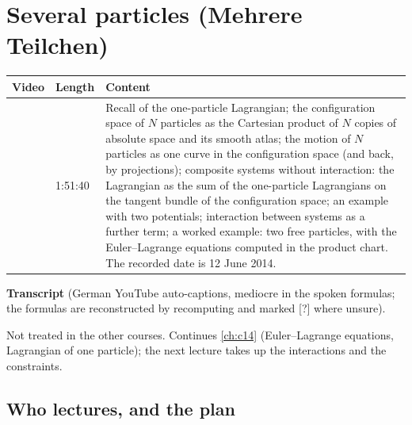 \chapter{Several particles (Mehrere Teilchen)}\label{ch:c15}
\begin{paracol}{2}

\begin{sources}
\begin{tabularx}{\linewidth}{@{}l l L@{}}
\toprule
\textbf{Video} & \textbf{Length} & \textbf{Content}\\
\midrule
{} & 1:51:40 & Recall of the one-particle Lagrangian; the configuration space of $N$ particles as the Cartesian product of $N$ copies of absolute space and its smooth atlas; the motion of $N$ particles as one curve in the configuration space (and back, by projections); composite systems without interaction: the Lagrangian as the sum of the one-particle Lagrangians on the tangent bundle of the configuration space; an example with two potentials; interaction between systems as a further term; a worked example: two free particles, with the Euler--Lagrange equations computed in the product chart. The recorded date is 12 June 2014.\\
\bottomrule
\end{tabularx}

\smallskip
\textbf{Transcript}  (German YouTube auto-captions, mediocre in the spoken formulas; the formulas are reconstructed by recomputing and marked [?] where unsure).
\end{sources}

\begin{reading}
Not treated in the other courses.
Continues \cref{ch:c14} (Euler--Lagrange equations, Lagrangian of one particle); the next lecture takes up the interactions and the constraints.
\end{reading}

\section{Who lectures, and the plan}\label{sec:mp-plan}


\end{paracol}
